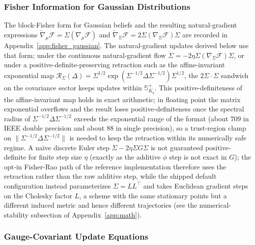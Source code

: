 \documentclass[11pt]{article}
\begin{document}
\subsubsection{Fisher Information for Gaussian Distributions}

The block-Fisher form for Gaussian beliefs and the resulting natural-gradient expressions $\tilde{\nabla}_\mu \mathcal{F} = \Sigma (\nabla_\mu \mathcal{F})$ and $\tilde{\nabla}_\Sigma \mathcal{F} = 2\Sigma (\nabla_\Sigma \mathcal{F}) \Sigma$ are recorded in Appendix~\ref{app:fisher_gaussian}. The natural-gradient updates derived below use that form; under the continuous natural-gradient flow $\dot{\Sigma} = -2\eta \Sigma(\nabla_\Sigma\mathcal{F})\Sigma$, or under a positive-definite-preserving retraction such as the affine-invariant exponential map $\mathcal{R}_\Sigma(\Delta) = \Sigma^{1/2}\exp(\Sigma^{-1/2}\Delta\Sigma^{-1/2})\Sigma^{1/2}$, the $2\Sigma \cdot \Sigma$ sandwich on the covariance sector keeps updates within $\mathbb{S}^+_{K_q}$. This positive-definiteness of the affine-invariant map holds in exact arithmetic; in floating point the matrix exponential overflows and the result loses positive-definiteness once the spectral radius of $\Sigma^{-1/2}\Delta\Sigma^{-1/2}$ exceeds the exponential range of the format (about $709$ in IEEE double precision and about $88$ in single precision), so a trust-region clamp on $\|\Sigma^{-1/2}\Delta\Sigma^{-1/2}\|$ is needed to keep the retraction within its numerically safe regime. A naive discrete Euler step $\Sigma - 2\eta \Sigma G\Sigma$ is not guaranteed positive-definite for finite step size $\eta$ (exactly as the additive $\phi$ step is not exact in $G$); the opt-in Fisher-Rao path of the reference implementation therefore uses the retraction rather than the raw additive step, while the shipped default configuration instead parameterizes $\Sigma = LL^\top$ and takes Euclidean gradient steps on the Cholesky factor $L$, a scheme with the same stationary points but a different induced metric and hence different trajectories (see the numerical-stability subsection of Appendix~\ref{app:math}).

\subsubsection{Gauge-Covariant Update Equations}
\end{document}

